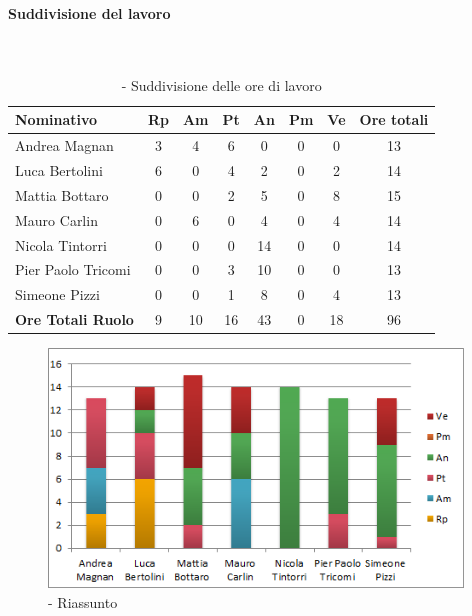 \documentclass[../PianoDiProgetto.tex]{subfiles}
\begin{document}
	\subsubsection{\PerPD}
				\paragraph{Suddivisione del lavoro}\
					
	
	\begin{table}[H]
	
		\begin{tabularx}{\textwidth}{l  * {6}{c}  c}
			\toprule
			\textbf{Nominativo} & \textbf{Rp} & \textbf{Am} & \textbf{Pt} 
						& \textbf{An} & \textbf{Pm} & \textbf{Ve} & \textbf{Ore totali} \\
			\midrule
			Andrea Magnan  & 3 & 4 & 6 & 0 & 0 & 0 & 13 \\
			Luca Bertolini  & 6 & 0 & 4 & 2 & 0 & 2 & 14 \\
			Mattia Bottaro  & 0 & 0 & 2 & 5 & 0 & 8 & 15 \\
			Mauro Carlin  & 0 & 6 & 0 & 4 & 0 & 4 & 14 \\
			Nicola Tintorri  & 0 & 0 & 0 & 14 & 0 & 0 & 14 \\
			Pier Paolo Tricomi  & 0 & 0 & 3 & 10 & 0 & 0 & 13 \\
			Simeone Pizzi & 0 & 0 & 1 & 8 & 0 & 4 & 13 \\
			\midrule			
			\textbf{Ore Totali Ruolo}& 9 & 10 & 16 & 43 & 0 & 18 & 96 \\
			\bottomrule	
		\end{tabularx}
		\caption{\PerPD{} - Suddivisione delle ore di lavoro}
		
	\end{table}
\vfill
\newpage
\vfill	
		
	\begin{figure}[H]
		\centering
		\includegraphics[width=11cm, trim=1cm 0cm 1cm 0cm]{grafici/PD-persona}
			\caption{\PerPD{} - Riassunto}
		
	\end{figure}
\vfill	
\end{document}
